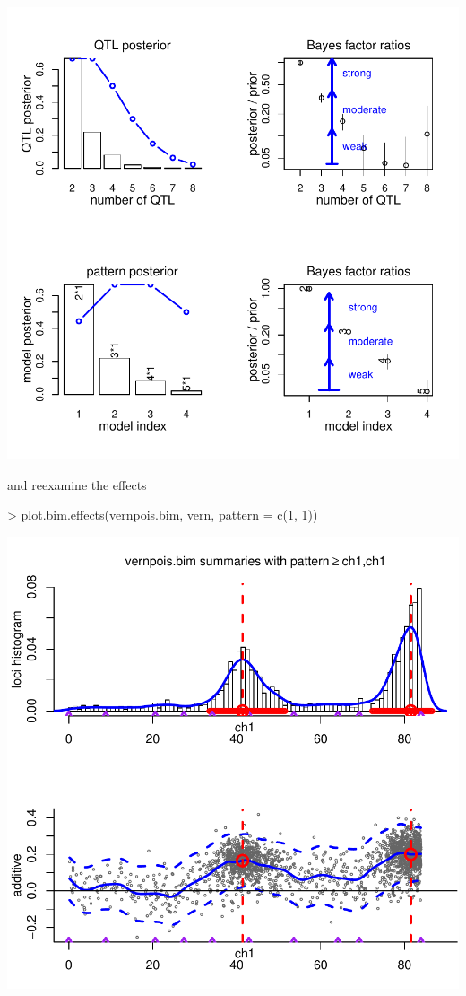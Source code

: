 \documentclass{article}
\begin{document}
\includegraphics{bim_summary-010}

\noindent and reexamine the effects

\begin{Schunk}
\begin{Sinput}
> plot.bim.effects(vernpois.bim, vern, pattern = c(1, 1))
\end{Sinput}
\end{Schunk}
\includegraphics{bim_summary-011}
\end{document}
